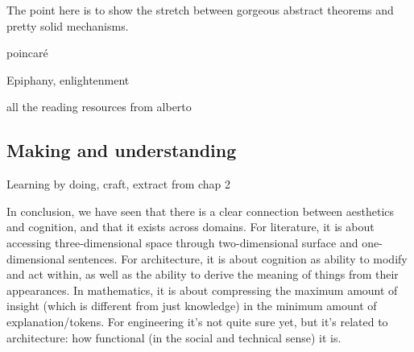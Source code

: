 The point here is to show the stretch between gorgeous abstract theorems and pretty solid mechanisms.

poincaré

Epiphany, enlightenment

all the reading resources from alberto


\subsection{Making and understanding}
\label{subsec:aesthetic-engineering}


Learning by doing, craft, extract from chap 2

\spacer

In conclusion, we have seen that there is a clear connection between aesthetics and cognition, and that it exists across domains. For literature, it is about accessing three-dimensional space through two-dimensional surface and one-dimensional sentences. For architecture, it is about cognition as ability to modify and act within, as well as the ability to derive the meaning of things from their appearances. In mathematics, it is about compressing the maximum amount of insight (which is different from just knowledge) in the minimum amount of explanation/tokens. For engineering it's not quite sure yet, but it's related to architecture: how functional (in the social and technical sense) it is.
